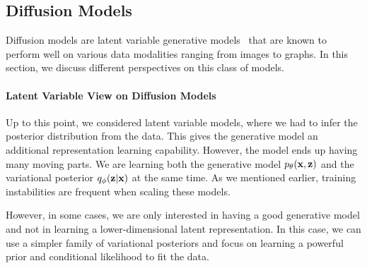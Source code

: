 \subsection{Diffusion Models}\label{sec:intro_diffusion}
Diffusion models are latent variable generative models~\cite{ho2020denoising, huang2021variational, kingma2021variational, tzen2019neural} that are known to perform well on various data modalities ranging from images to graphs. In this section, we discuss different perspectives on this class of models. 

\paragraph{Latent Variable View on Diffusion Models}
Up to this point, we considered latent variable models, where we had to infer the posterior distribution from the data. 
This gives the generative model an additional representation learning capability. 
However, the model ends up having many moving parts. 
We are learning both the generative model $p_{\theta}({\mathbf{x}}, {\mathbf{z}})$ and the variational posterior $q_{\phi}({\mathbf{z}}|{\mathbf{x}})$ at the same time.  
As we mentioned earlier, training instabilities are frequent when scaling these models. 

However, in some cases, we are only interested in having a good generative model and not in learning a lower-dimensional latent representation. 
In this case, we can use a simpler family of variational posteriors and focus on learning a powerful prior and conditional likelihood to fit the data.  

